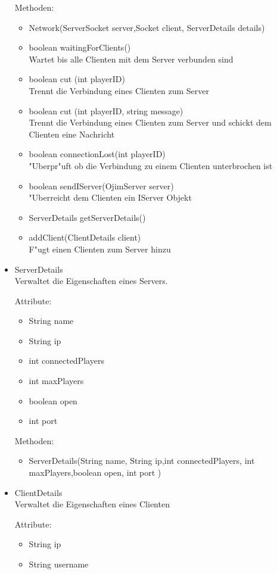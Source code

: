 \documentclass[a4paper,10pt]{article}
\begin{document}
\begin{itemize}
Methoden:
\begin{itemize}
\item Network(ServerSocket server,Socket client, ServerDetails details) 
\item boolean waitingForClients()
\\Wartet bis alle Clienten mit dem Server verbunden sind
\item boolean cut (int playerID)
\\Trennt die Verbindung eines Clienten zum Server
\item boolean cut (int playerID, string message)
\\Trennt die Verbindung eines Clienten zum Server und schickt dem Clienten eine Nachricht
\item boolean connectionLost(int playerID)
\\"Uberpr"uft ob die Verbindung zu einem Clienten unterbrochen ist
\item boolean sendIServer(OjimServer server)
\\"Uberreicht dem Clienten ein IServer Objekt
\item ServerDetails getServerDetails()
\item addClient(ClientDetails client)
\\F"ugt einen Clienten zum Server hinzu
\end{itemize} %
\item ServerDetails \\
Verwaltet die Eigenschaften eines Servers.

Attribute:
\begin{itemize}
\item String name
\item String ip
\item int connectedPlayers
\item int maxPlayers
\item boolean open
\item int port
\end{itemize}

Methoden:
\begin{itemize}
\item ServerDetails(String name, String ip,int connectedPlayers, int maxPlayers,boolean open, int port ) 
\end{itemize}
\item ClientDetails\\
Verwaltet die Eigenschaften eines Clienten

Attribute:
\begin{itemize}
\item String ip
\item String username
\end{itemize}


\end{itemize}
\end{document}
